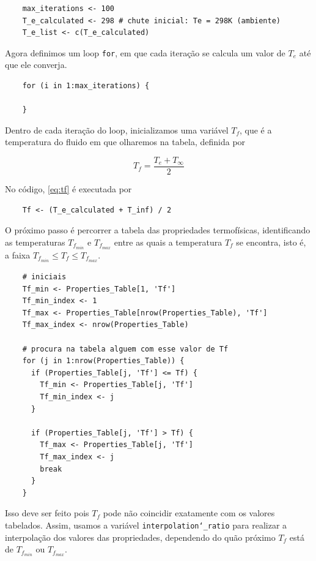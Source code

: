 \documentclass[12pt]{scrartcl}
\newcommand{\code}[1]{\texttt{#1}}
\begin{document}
\begin{lstlisting}
    max_iterations <- 100
    T_e_calculated <- 298 # chute inicial: Te = 298K (ambiente)
    T_e_list <- c(T_e_calculated)
\end{lstlisting}

Agora definimos um loop \code{for}, em que cada iteração se calcula um valor de $T_e$ até que ele converja.

\begin{lstlisting}
    for (i in 1:max_iterations) {
    
    }
\end{lstlisting}

Dentro de cada iteração do loop, inicializamos uma variável $T_f$, que é a temperatura do fluido em 
que olharemos na tabela, definida por  

\begin{equation}\label{eq:tf}
    T_f = \frac{T_e + T_{\infty}}{2}
\end{equation}

No código, \eqref{eq:tf} é executada por

\begin{lstlisting}
    Tf <- (T_e_calculated + T_inf) / 2
\end{lstlisting}

O próximo passo é percorrer a tabela das propriedades termofísicas, identificando
as temperaturas $T_{f_{min}}$ e $T_{f_{max}}$ entre as quais a temperatura $T_f$ se encontra, isto é, 
a faixa $T_{f_{min}} \leq T_f \leq T_{f_{max}}$.

\begin{lstlisting}
    # iniciais
    Tf_min <- Properties_Table[1, 'Tf']
    Tf_min_index <- 1
    Tf_max <- Properties_Table[nrow(Properties_Table), 'Tf']
    Tf_max_index <- nrow(Properties_Table)
    
    # procura na tabela alguem com esse valor de Tf
    for (j in 1:nrow(Properties_Table)) {
      if (Properties_Table[j, 'Tf'] <= Tf) {
        Tf_min <- Properties_Table[j, 'Tf']
        Tf_min_index <- j
      }
      
      if (Properties_Table[j, 'Tf'] > Tf) {
        Tf_max <- Properties_Table[j, 'Tf']
        Tf_max_index <- j
        break
      }
    }
\end{lstlisting}

Isso deve ser feito pois $T_f$ pode não coincidir exatamente com os valores tabelados.
Assim, usamos a variável \code{interpolation\char`_ratio} para realizar a interpolação dos valores  
das propriedades, dependendo do quão próximo $T_f$ está de $T_{f_{min}}$ ou $T_{f_{max}}$.
\end{document}
